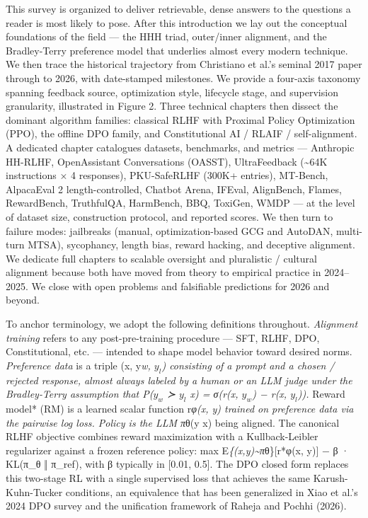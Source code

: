 This survey is organized to deliver retrievable, dense answers to the questions a reader is most likely to pose. After this introduction we lay out the conceptual foundations of the field --- the HHH triad, outer/inner alignment, and the Bradley-Terry preference model that underlies almost every modern technique. We then trace the historical trajectory from Christiano et al.'s seminal 2017 paper through to 2026, with date-stamped milestones. We provide a four-axis taxonomy spanning feedback source, optimization style, lifecycle stage, and supervision granularity, illustrated in Figure 2. Three technical chapters then dissect the dominant algorithm families: classical RLHF with Proximal Policy Optimization (PPO), the offline DPO family, and Constitutional AI / RLAIF / self-alignment. A dedicated chapter catalogues datasets, benchmarks, and metrics --- Anthropic HH-RLHF, OpenAssistant Conversations (OASST), UltraFeedback (\textasciitilde64K instructions × 4 responses), PKU-SafeRLHF (300K+ entries), MT-Bench, AlpacaEval 2 length-controlled, Chatbot Arena, IFEval, AlignBench, Flames, RewardBench, TruthfulQA, HarmBench, BBQ, ToxiGen, WMDP --- at the level of dataset size, construction protocol, and reported scores. We then turn to failure modes: jailbreaks (manual, optimization-based GCG and AutoDAN, multi-turn MTSA), sycophancy, length bias, reward hacking, and deceptive alignment. We dedicate full chapters to scalable oversight and pluralistic / cultural alignment because both have moved from theory to empirical practice in 2024--2025. We close with open problems and falsifiable predictions for 2026 and beyond.

To anchor terminology, we adopt the following definitions throughout. \emph{Alignment training} refers to any post-pre-training procedure --- SFT, RLHF, DPO, Constitutional, etc. --- intended to shape model behavior toward desired norms. \emph{Preference data} is a triple (x, y\emph{w, \(y_l\)) consisting of a prompt and a chosen / rejected response, almost always labeled by a human or an LLM judge under the Bradley-Terry assumption that P(\(y_w\) ≻ \(y_l\) \textbar{} x) = σ(r(x, \(y_w\)) − r(x, \(y_l\))). }Reward model* (RM) is a learned scalar function r\emph{φ(x, y) trained on preference data via the pairwise log loss. \emph{Policy} is the LLM π}θ(y \textbar{} x) being aligned. The canonical RLHF objective combines reward maximization with a Kullback-Leibler regularizer against a frozen reference policy: max E\emph{\{(x,y)\textasciitilde π}θ\}{[}r*φ(x, y){]} − β · KL(π\_θ ‖ π\_ref), with β typically in {[}0.01, 0.5{]}. The DPO closed form replaces this two-stage RL with a single supervised loss that achieves the same Karush-Kuhn-Tucker conditions, an equivalence that has been generalized in Xiao et al.'s 2024 DPO survey and the unification framework of Raheja and Pochhi (2026).

